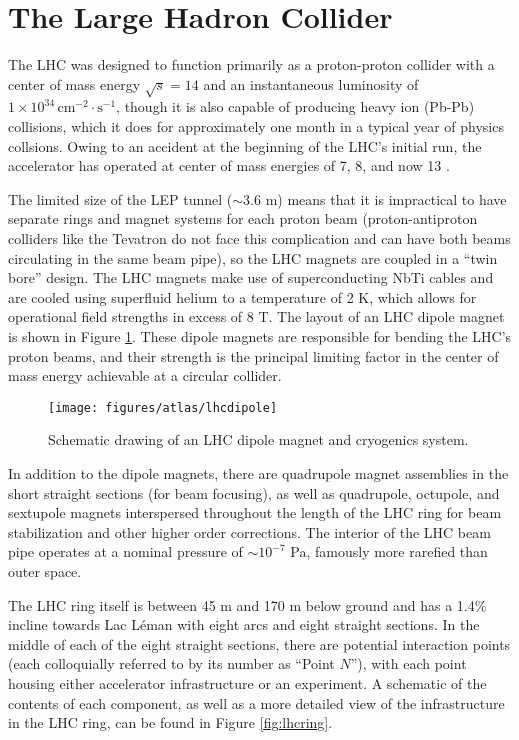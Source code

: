 \section{The Large Hadron Collider}
The LHC was designed to function primarily as a proton-proton collider with a center of mass energy $\sqrt{s}=14$ \TeV and an instantaneous luminosity of $1\times10^{34}\,\text{cm}^{-2}\cdot\text{s}^{-1}$, though it is also capable of producing heavy ion (Pb-Pb) collisions, which it does for approximately one month in a typical year of physics collsions.  Owing to an accident at the beginning of the LHC's initial run, the accelerator has operated at center of mass energies of 7, 8, and now 13 \TeV.

The limited size of the LEP tunnel ($\sim 3.6$ m) means that it is impractical to have separate rings and magnet systems for each proton beam (proton-antiproton colliders like the Tevatron do not face this complication and can have both beams circulating in the same beam pipe), so the LHC magnets are coupled in a ``twin bore'' design.  The LHC magnets make use of superconducting NbTi cables and are cooled using superfluid helium to a temperature of 2 K, which allows for operational field strengths in excess of 8 T.  The layout of an LHC dipole magnet is shown in Figure \ref{fig:lhcdipole}.  These dipole magnets are responsible for bending the LHC's proton beams, and their strength is the principal limiting factor in the center of mass energy achievable at a circular collider.

\begin{figure}[!htbp]\captionsetup{justification=centering}
  \centering
  \texttt{[image: figures/atlas/lhcdipole]}
  \caption{Schematic drawing of an LHC dipole magnet and cryogenics system.}
  \label{fig:lhcdipole}
\end{figure}

In addition to the dipole magnets, there are quadrupole magnet assemblies in the short straight sections (for beam focusing), as well as quadrupole, octupole, and sextupole magnets interspersed throughout the length of the LHC ring for beam stabilization and other higher order corrections.  The interior of the LHC beam pipe operates at a nominal pressure of $\sim10^{-7}$ Pa, famously more rarefied than outer space.

  The LHC ring itself is between 45 m and 170 m below ground and has a 1.4\% incline towards Lac L\'eman with eight arcs and eight straight sections.  In the middle of each of the eight straight sections, there are potential interaction points (each colloquially referred to by its number as ``Point $N$''), with each point housing either accelerator infrastructure or an experiment.  A schematic of the contents of each component, as well as a more detailed view of the infrastructure in the LHC ring, can be found in Figure \ref{fig:lhcring}.

